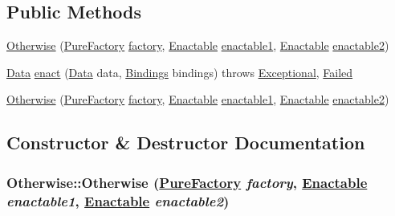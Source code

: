 \subsection*{Public Methods}
\begin{CompactItemize}
\item 
\hyperlink{classOtherwise_a0}{Otherwise} (\hyperlink{classPureFactory}{Pure\-Factory} \hyperlink{classDataImpl_o0}{factory}, \hyperlink{interfaceEnactable}{Enactable} \hyperlink{classAbstractInfixCombinator_o0}{enactable1}, \hyperlink{interfaceEnactable}{Enactable} \hyperlink{classAbstractInfixCombinator_o1}{enactable2})
\item 
\hyperlink{interfaceData}{Data} \hyperlink{classOtherwise_a1}{enact} (\hyperlink{interfaceData}{Data} data, \hyperlink{interfaceBindings}{Bindings} bindings) throws \hyperlink{classExceptional}{Exceptional}, \hyperlink{classFailed}{Failed}
\item 
\hyperlink{classOtherwise_a2}{Otherwise} (\hyperlink{classPureFactory}{Pure\-Factory} \hyperlink{classDataImpl_o0}{factory}, \hyperlink{interfaceEnactable}{Enactable} \hyperlink{classAbstractInfixCombinator_o0}{enactable1}, \hyperlink{interfaceEnactable}{Enactable} \hyperlink{classAbstractInfixCombinator_o1}{enactable2})
\end{CompactItemize}


\subsection{Constructor \& Destructor Documentation}
\hypertarget{classOtherwise_a0}{
\subsubsection[Otherwise]{\setlength{\rightskip}{0pt plus 5cm}Otherwise::Otherwise (\hyperlink{classPureFactory}{Pure\-Factory} {\em factory}, \hyperlink{interfaceEnactable}{Enactable} {\em enactable1}, \hyperlink{interfaceEnactable}{Enactable} {\em enactable2})}}
\label{classOtherwise_a0}





